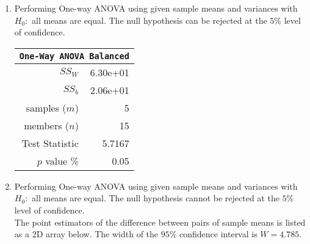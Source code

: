 \begin{enumerate}
\begin{table}[H]
		\bigskip
	\end{table}

	\item Performing One-way ANOVA using given sample means and variances with $ H_0 : $ all means are equal. The null hypothesis can be rejected at the $ 5\% $ level of confidence.
	
	\begin{table}[H]
		\centering
		\begin{tabular}{@{}rr@{}}
			\toprule
			\multicolumn{2}{c}{\texttt{One-Way ANOVA Balanced}} \\
			\midrule
			$SS_W$         &               6.30e+01 \\
			$SS_b$         &               2.06e+01 \\
			samples ($m$)  &                      5 \\
			members ($n$)  &                     15 \\
			Test Statistic &                 5.7167 \\
			$p$ value \%   &                   0.05 \\
			\bottomrule
		\end{tabular}
		
		\bigskip
	\end{table}

	\item Performing One-way ANOVA using given sample means and variances with $ H_0 : $ all means are equal. The null hypothesis cannot be rejected at the $ 5\% $ level of confidence. \\
	
	The point estimators of the difference between pairs of sample means is listed as a 2D array below. The width of the $ 95\% $ confidence interval is $ W = 4.785 $.\\
	

\end{enumerate}
